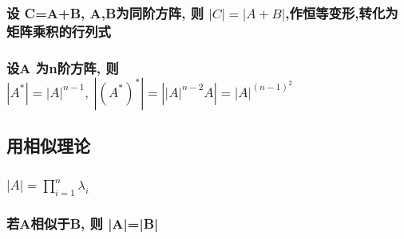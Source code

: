 \documentclass[UTF8]{ctexart}
\begin{document}
			\subsubsection{设 C=A+B, A,B为同阶方阵, 则 $|C|=|A+B|$,作恒等变形,转化为矩阵乘积的行列式 }
			
			\subsubsection{设A 为n阶方阵, 则 $|A^*|=|A|^{n-1},\ |(A^*)^*|=\left| \left| A \right|^{n-2}A \right|=\left| A \right|^{\left( n-1 \right) ^2}	$}
		
		\subsection{用相似理论}
		
			\subsubsection{$\left| A \right|=\prod_{i=1}^n{\lambda _i}$}
			
			\subsubsection{若A相似于B, 则 |A|=|B|}
	
	
	
\end{document}
